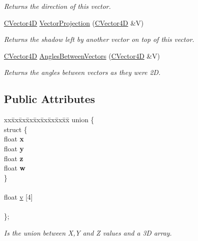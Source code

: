 \begin{DoxyCompactItemize}
\begin{DoxyCompactList}\small\item\em Returns the direction of this vector. \end{DoxyCompactList}\item 
\hyperlink{struct_c_vector4_d}{C\+Vector4D} \hyperlink{struct_c_vector4_d_acde2df9ff21b21b3fa2b38e318a6d2d5}{Vector\+Projection} (\hyperlink{struct_c_vector4_d}{C\+Vector4D} \&V)
\begin{DoxyCompactList}\small\item\em Returns the shadow left by another vector on top of this vector. \end{DoxyCompactList}\item 
\hyperlink{struct_c_vector4_d}{C\+Vector4D} \hyperlink{struct_c_vector4_d_a74548210202eefd6e4d5df4bce2c6580}{Angles\+Between\+Vectors} (\hyperlink{struct_c_vector4_d}{C\+Vector4D} \&V)
\begin{DoxyCompactList}\small\item\em Returns the angles between vectors as they were 2D. \end{DoxyCompactList}\end{DoxyCompactItemize}
\subsection*{Public Attributes}
\begin{DoxyCompactItemize}
\item 
\begin{tabbing}
xx\=xx\=xx\=xx\=xx\=xx\=xx\=xx\=xx\=\kill
union \{\\
\>struct \{\\
\>\>float {\bfseries x}\\
\>\>float {\bfseries y}\\
\>\>float {\bfseries z}\\
\>\>float {\bfseries w}\\
\>\} \hypertarget{union_c_vector4_d_1_1_0D28_a37f45809f48078f750c4cd20da717ae1}{}\label{union_c_vector4_d_1_1_0D28_a37f45809f48078f750c4cd20da717ae1}
\\
\>\>\\
\>float \hyperlink{struct_c_vector4_d_a7fe11aebe4b13a0cf10e1edbd2c01916}{v} \mbox{[}4\mbox{]}\\
\>\>\\
\}; \hypertarget{struct_c_vector4_d_ab7011c93548b6752e809459b085a5dc8}{}\label{struct_c_vector4_d_ab7011c93548b6752e809459b085a5dc8}
\\

\end{tabbing}\begin{DoxyCompactList}\small\item\em Is the union between X,Y and Z values and a 3D array. \end{DoxyCompactList}\end{DoxyCompactItemize}


